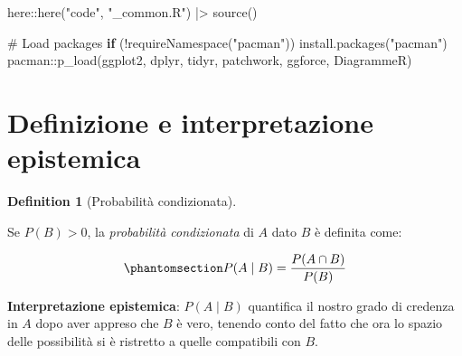 \documentclass[
  letterpaper,
  DIV=11,
  numbers=noendperiod,
  oneside]{scrreprt}
\newenvironment{Shaded}{\begin{snugshade}}{\end{snugshade}}
\newcommand{\CommentTok}[1]{\textcolor[rgb]{0.37,0.37,0.37}{#1}}
\newcommand{\ControlFlowTok}[1]{\textcolor[rgb]{0.00,0.23,0.31}{\textbf{#1}}}
\newcommand{\FunctionTok}[1]{\textcolor[rgb]{0.28,0.35,0.67}{#1}}
\newcommand{\NormalTok}[1]{\textcolor[rgb]{0.00,0.23,0.31}{#1}}
\newcommand{\SpecialCharTok}[1]{\textcolor[rgb]{0.37,0.37,0.37}{#1}}
\newcommand{\StringTok}[1]{\textcolor[rgb]{0.13,0.47,0.30}{#1}}
\theoremstyle{definition}
\theoremstyle{plain}
\theoremstyle{definition}
\newtheorem{definition}{Definition}[chapter]
\theoremstyle{remark}
\begin{document}
\begin{tcolorbox}[enhanced jigsaw, arc=.35mm, breakable, colbacktitle=quarto-callout-caution-color!10!white, opacityback=0, toprule=.15mm, rightrule=.15mm, colback=white, opacitybacktitle=0.6, leftrule=.75mm, coltitle=black, bottomtitle=1mm, left=2mm, toptitle=1mm, title=\textcolor{quarto-callout-caution-color}{\faFire}\hspace{0.5em}{Preparazione del Notebook}, titlerule=0mm, bottomrule=.15mm, colframe=quarto-callout-caution-color-frame]

\begin{Shaded}
\begin{Highlighting}[]
\NormalTok{here}\SpecialCharTok{::}\FunctionTok{here}\NormalTok{(}\StringTok{"code"}\NormalTok{, }\StringTok{"\_common.R"}\NormalTok{) }\SpecialCharTok{|\textgreater{}} 
  \FunctionTok{source}\NormalTok{()}

\CommentTok{\# Load packages}
\ControlFlowTok{if}\NormalTok{ (}\SpecialCharTok{!}\FunctionTok{requireNamespace}\NormalTok{(}\StringTok{"pacman"}\NormalTok{)) }\FunctionTok{install.packages}\NormalTok{(}\StringTok{"pacman"}\NormalTok{)}
\NormalTok{pacman}\SpecialCharTok{::}\FunctionTok{p\_load}\NormalTok{(ggplot2, dplyr, tidyr, patchwork, ggforce, DiagrammeR)}
\end{Highlighting}
\end{Shaded}

\end{tcolorbox}

\section{Definizione e interpretazione
epistemica}\label{definizione-e-interpretazione-epistemica}

\begin{definition}[Probabilità
condizionata]\protect\hypertarget{def-conditional-probability}{}\label{def-conditional-probability}

Se \(P(B) > 0\), la \emph{probabilità condizionata} di \(A\) dato \(B\)
è definita come:

\begin{equation}\phantomsection\label{eq-prob-cond-def}{
P(A \mid B) = \frac{P(A \cap B)}{P(B)}
}\end{equation}

\textbf{Interpretazione epistemica}: \(P(A \mid B)\) quantifica il
nostro grado di credenza in \(A\) dopo aver appreso che \(B\) è vero,
tenendo conto del fatto che ora lo spazio delle possibilità si è
ristretto a quelle compatibili con \(B\).

\end{definition}
\end{document}
